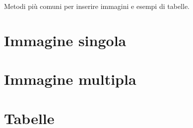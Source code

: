 Metodi più comuni per inserire immagini e esempi di tabelle.

\section{Immagine singola}


\section{Immagine multipla}


\section{Tabelle}

